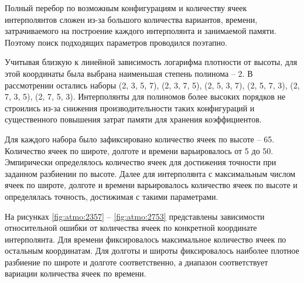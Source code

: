 Полный перебор по возможным конфигурациям и количеству ячеек интерполянтов сложен
из-за большого количества вариантов, времени, затрачиваемого на построение каждого интерполянта и
занимаемой памяти. Поэтому поиск подходящих параметров проводился поэтапно.

Учитывая близкую к линейной зависимость логарифма плотности от высоты, для этой координаты
была выбрана наименьшая степень полинома -- 2. В рассмотрении остались наборы 
(2, 3, 5, 7), (2, 3, 7, 5), (2, 5, 3, 7), (2, 5, 7, 3), (2, 7, 3, 5),
(2, 7, 5, 3). Интерполянты для полиномов более
высоких порядков не строились из-за снижения производительности таких конфигураций и
существенного повышения затрат памяти для хранения коэффициентов.

Для каждого набора было зафиксировано количество ячеек по высоте -- 65. Количество ячеек
по широте, долготе и времени варьировалось от 5 до 50. Эмпирически определялось
количество ячеек для достижения точности при заданном разбиении по высоте. Далее
для интерполянта с максимальным числом ячеек по широте, долготе и времени варьировалось
количество ячеек по высоте и определялась точность, достижимая с такими параметрами.

На рисунках \ref{fig:atmo:2357} -- \ref{fig:atmo:2753} представлены зависимости относительной ошибки от количества ячеек по
конкретной координате интерполянта. Для времени фиксировалось
максимальное количество ячеек по остальным координатам. Для долготы и широты
фиксировалось наиболее плотное разбиение по широте и долготе соответственно, а диапазон
соответствует вариации количества ячеек по времени.

    
    
